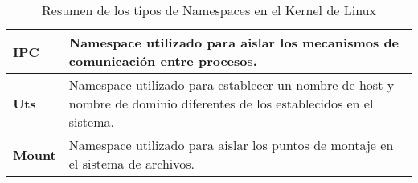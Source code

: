 \begin{table}[ht]
{\begin{tabular}{|l|l|}
            \textbf{IPC}                                                                                    & Namespace utilizado para aislar los mecanismos de comunicación entre procesos.                                                                                                                                           \\ \hline
            \textbf{Uts}                                                                                    & Namespace utilizado para establecer un nombre de host y nombre de dominio diferentes de los establecidos en el sistema.                                                                                                  \\ \hline
            \textbf{Mount}                                                                                  & Namespace utilizado para aislar los puntos de montaje en el sistema de archivos.                                                                                                                                         \\ \hline
        \end{tabular}%
    }
    \caption{Resumen de los tipos de Namespaces en el Kernel de Linux}
    \label{tab:linux_ns}
\end{table}
